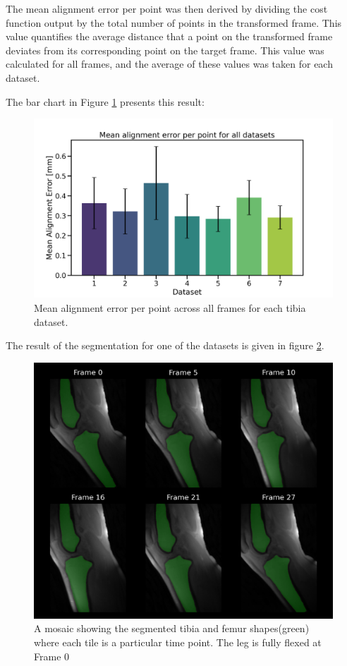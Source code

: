 \documentclass{micro-econ-thesis}
\begin{document}
The mean alignment error per point was then derived by dividing the cost function output by the total number of points in the transformed frame. This value quantifies the average distance that a point on the transformed frame deviates from its corresponding point on the target frame. This value was calculated for all frames, and the average of these values was taken for each dataset.

The bar chart in Figure \ref{fig:avgofavg} presents this result: 

\begin{figure}[H]
	\centering
	\includegraphics[width=0.7\linewidth]{bar_alignment}
	\caption{Mean alignment error per point across all frames for each tibia dataset.}
	\label{fig:avgofavg}
\end{figure}


The result of the segmentation for one of the datasets is given in figure \ref{fig:fullsegmented}. 

\begin{figure}[H]
	\centering
	\includegraphics[width=0.7\linewidth]{full_segmented}
	\caption{A mosaic showing the segmented tibia and femur shapes(green) where each tile is a particular time point. The leg is fully flexed at Frame 0}
	\label{fig:fullsegmented}
\end{figure}
\end{document}
